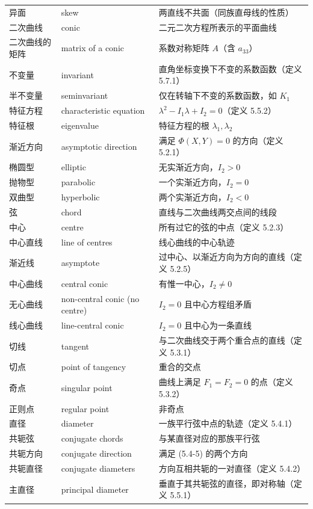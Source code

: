 \documentclass[UTF8,11pt,a4paper]{ctexart}
\theoremstyle{definition}
\begin{document}
\begin{small}
\begin{longtable}{@{}p{3.4cm}p{4.6cm}p{7.4cm}@{}}
异面 & skew & 两直线不共面（同族直母线的性质） \\
二次曲线 & conic & 二元二次方程所表示的平面曲线 \\
二次曲线的矩阵 & matrix of a conic & 系数对称矩阵 $A$（含 $a_{33}$） \\
不变量 & invariant & 直角坐标变换下不变的系数函数（定义 5.7.1） \\
半不变量 & seminvariant & 仅在转轴下不变的系数函数，如 $K_1$ \\
特征方程 & characteristic equation & $\lambda^2-I_1\lambda+I_2=0$（定义 5.5.2） \\
特征根 & eigenvalue & 特征方程的根 $\lambda_1,\lambda_2$ \\
渐近方向 & asymptotic direction & 满足 $\Phi(X,Y)=0$ 的方向（定义 5.2.1） \\
椭圆型 & elliptic & 无实渐近方向，$I_2>0$ \\
抛物型 & parabolic & 一个实渐近方向，$I_2=0$ \\
双曲型 & hyperbolic & 两个实渐近方向，$I_2<0$ \\
弦 & chord & 直线与二次曲线两交点间的线段 \\
中心 & centre & 所有过它的弦的中点（定义 5.2.3） \\
中心直线 & line of centres & 线心曲线的中心轨迹 \\
渐近线 & asymptote & 过中心、以渐近方向为方向的直线（定义 5.2.5） \\
中心曲线 & central conic & 有惟一中心，$I_2\ne0$ \\
无心曲线 & non-central conic (no centre) & $I_2=0$ 且中心方程组矛盾 \\
线心曲线 & line-central conic & $I_2=0$ 且中心为一条直线 \\
切线 & tangent & 与二次曲线交于两个重合点的直线（定义 5.3.1） \\
切点 & point of tangency & 重合的交点 \\
奇点 & singular point & 曲线上满足 $F_1=F_2=0$ 的点（定义 5.3.2） \\
正则点 & regular point & 非奇点 \\
直径 & diameter & 一族平行弦中点的轨迹（定义 5.4.1） \\
共轭弦 & conjugate chords & 与某直径对应的那族平行弦 \\
共轭方向 & conjugate direction & 满足 (5.4-5) 的两个方向 \\
共轭直径 & conjugate diameters & 方向互相共轭的一对直径（定义 5.4.2） \\
主直径 & principal diameter & 垂直于其共轭弦的直径，即对称轴（定义 5.5.1） \\

\end{longtable}
\end{small}
\end{document}
